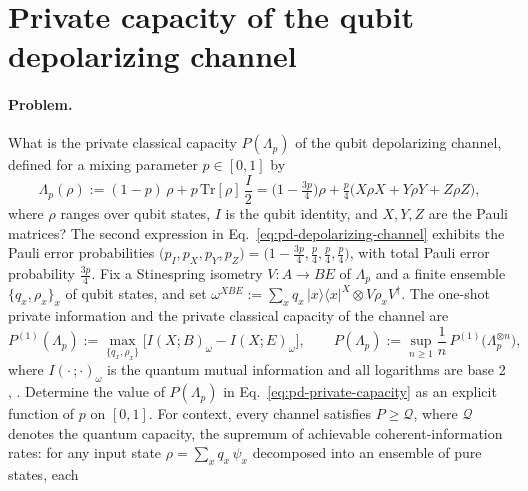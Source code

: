 \section{Private capacity of the qubit depolarizing channel}
\label{sec:op_d2813fe3fcdf09ad}

\paragraph{Problem.}
What is the private classical capacity $P(\Lambda_p)$ of the qubit depolarizing
channel, defined for a mixing parameter $p\in[0,1]$ by
\begin{equation}
  \Lambda_p(\rho):=(1-p)\,\rho+p\,\mathrm{Tr}[\rho]\,\frac{I}{2}
  =\bigl(1-\tfrac{3p}{4}\bigr)\rho
  +\tfrac{p}{4}\bigl(X\rho X+Y\rho Y+Z\rho Z\bigr),
  \label{eq:pd-depolarizing-channel}
\end{equation}
where $\rho$ ranges over qubit states, $I$ is the qubit identity, and
$X,Y,Z$ are the Pauli matrices?  The second expression in
Eq.~\eqref{eq:pd-depolarizing-channel} exhibits the Pauli error probabilities
$\bigl(p_I,p_X,p_Y,p_Z\bigr)=\bigl(1-\tfrac{3p}{4},\tfrac{p}{4},\tfrac{p}{4},
\tfrac{p}{4}\bigr)$, with total Pauli error probability $\tfrac{3p}{4}$.
Fix a Stinespring isometry $V:A\to BE$ of $\Lambda_p$ and a finite ensemble
$\{q_x,\rho_x\}_x$ of qubit states, and set
$\omega^{XBE}:=\sum_x q_x\,|x\rangle\!\langle x|^X\otimes V\rho_xV^\dagger$.
The one-shot private information and the private classical capacity of the
channel are
\begin{equation}
  P^{(1)}(\Lambda_p):=\max_{\{q_x,\rho_x\}}
  \bigl[I(X;B)_\omega-I(X;E)_\omega\bigr],
  \qquad
  P(\Lambda_p):=\sup_{n\ge1}\frac{1}{n}\,
  P^{(1)}\bigl(\Lambda_p^{\otimes n}\bigr),
  \label{eq:pd-private-capacity}
\end{equation}
where $I(\cdot\,;\cdot)_\omega$ is the quantum mutual information and all
logarithms are base 2 ,
.  Determine the value of
$P(\Lambda_p)$ in Eq.~\eqref{eq:pd-private-capacity} as an explicit function
of $p$ on $[0,1]$.  For context, every channel satisfies $P\ge\mathcal Q$,
where $\mathcal Q$ denotes the quantum capacity, the supremum of achievable
coherent-information rates: for any input state
$\rho=\sum_x q_x\,\psi_x$ decomposed into an ensemble of pure states, each
